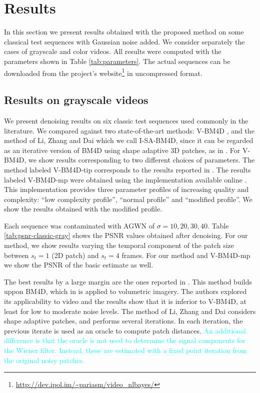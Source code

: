 \documentclass[10pt, journal, twocolumn, final, a4paper]{IEEEtran}
\newcommand{\pa}[1]{\textcolor{cyan}{#1}}
\newcommand{\padd}[1]{\pa{#1}}
\begin{document}
\section{Results}
\label{sec:results}

In this section we present results obtained with the proposed
method on some classical test sequences with Gaussian noise added.
We consider separately the cases of grayscale and color videos.
All results were computed with the parameters shown in Table \ref{tab:parameters}.
The actual sequences can be downloaded from the project's
website\footnote{\url{http://dev.ipol.im/~pariasm/video_nlbayes/}} in uncompressed format.

\subsection{Results on grayscale videos}

We present denoising results on six classic test sequences used commonly in the
literature. We compared against two state-of-the-art methods: V-BM4D
\cite{Maggioni2012}, and the method of Li, Zhang and Dai \cite{LiZhangDai2011}
which we call I-SA-BM4D, since it can be regarded as an iterative version of BM4D \cite{Maggioni2013}
using shape adaptive 3D patches, as in \cite{Ercole2005}.  
For V-BM4D, we show results corresponding to two
different choices of parameters. The method labeled V-BM4D-tip
corresponds to the results reported
in \cite{Maggioni2012}. The results labeled V-BM4D-mp were
obtained using the implementation available online \cite{bm4dcode}. This
implementation provides three parameter profiles of increasing quality and
complexity: ``low complexity profile'', ``normal profile'' and ``modified
profile''. We show the results obtained with the modified profile.

Each sequence was contaminated with AGWN of $\sigma =
10,20,30,40$. Table \ref{tab:psnr-classic-gray} shows the
PSNR values obtained after denoising. For our method, we show results varying the temporal
component of the patch size between $s_t = 1$ (2D patch) and $s_t = 4$ frames.
For our method and V-BM4D-mp we show the PSNR of the basic estimate as well.

The best results by a large margin are the ones reported in
\cite{LiZhangDai2011}. This method builds uppon BM4D, which in \cite{Maggioni2013}
is applied to volumetric imagery. The authors explored its applicability to video 
and the results show that it is inferior to V-BM4D, at least 
for low to moderate noise levels. The method of Li, Zhang and Dai \cite{LiZhangDai2011} 
considers shape adaptive patches, and performs several iterations. In each iteration,
the previous iterate is used as an oracle to compute patch distances.
\padd{An additional difference is that the oracle is not used to determine the
signal components for the Wiener filter. Instead, these are estimated with a fixed
point iteration from the original noisy patches.}
\end{document}
